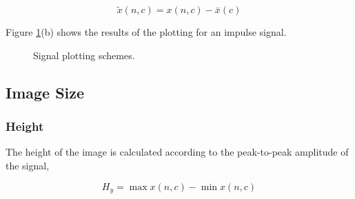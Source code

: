 \begin{equation}
\tilde{x}(n,c) =  x(n,c) - \bar{x}(c) 
\label{eq:standarizedaverages}
\end{equation}

Figure \ref{fig:plottingscheme}(b) shows the results of the plotting for an impulse signal.

\begin{figure}[htb]
\centering
{}
\caption[Signal plot of an impulse response]{Signal plotting schemes.}
\label{fig:plottingscheme}
\end{figure}

\subsection{Image Size}

\subsubsection{Height}

The height of the image is calculated according to the peak-to-peak amplitude of the signal,

\begin{equation}
H_y = \max x(n,c) - \min x(n,c)
\label{eq:standarizedaverages}
\end{equation}

